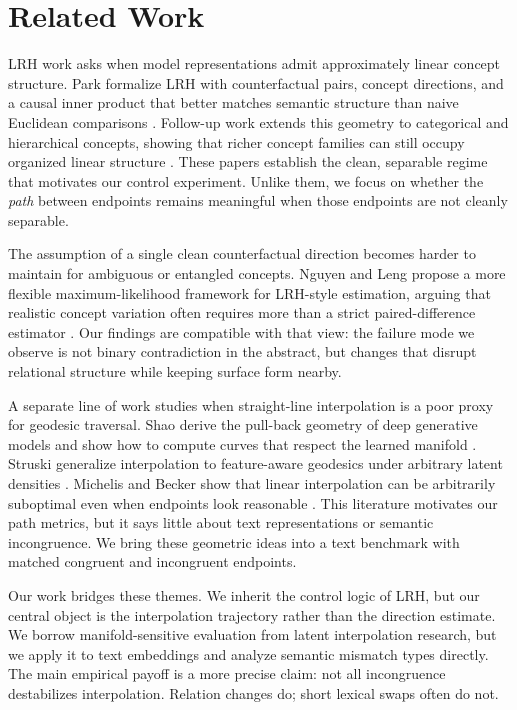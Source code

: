 \section{Related Work}
\label{sec:related}

 LRH work asks when model representations admit approximately linear concept structure. Park \etal formalize LRH with counterfactual pairs, concept directions, and a causal inner product that better matches semantic structure than naive Euclidean comparisons \cite{park2024lrh}. Follow-up work extends this geometry to categorical and hierarchical concepts, showing that richer concept families can still occupy organized linear structure \cite{park2025categorical}. These papers establish the clean, separable regime that motivates our control experiment. Unlike them, we focus on whether the {\it path} between endpoints remains meaningful when those endpoints are not cleanly separable.

 The assumption of a single clean counterfactual direction becomes harder to maintain for ambiguous or entangled concepts. Nguyen and Leng propose a more flexible maximum-likelihood framework for LRH-style estimation, arguing that realistic concept variation often requires more than a strict paired-difference estimator \cite{nguyen2025sand}. Our findings are compatible with that view: the failure mode we observe is not binary contradiction in the abstract, but changes that disrupt relational structure while keeping surface form nearby.

 A separate line of work studies when straight-line interpolation is a poor proxy for geodesic traversal. Shao \etal derive the pull-back geometry of deep generative models and show how to compute curves that respect the learned manifold \cite{shao2017riemannian}. Struski \etal generalize interpolation to feature-aware geodesics under arbitrary latent densities \cite{struski2019feature}. Michelis and Becker show that linear interpolation can be arbitrarily suboptimal even when endpoints look reasonable \cite{michelis2021linear}. This literature motivates our path metrics, but it says little about text representations or semantic incongruence. We bring these geometric ideas into a text benchmark with matched congruent and incongruent endpoints.

 Our work bridges these themes. We inherit the control logic of LRH, but our central object is the interpolation trajectory rather than the direction estimate. We borrow manifold-sensitive evaluation from latent interpolation research, but we apply it to text embeddings and analyze semantic mismatch types directly. The main empirical payoff is a more precise claim: not all incongruence destabilizes interpolation. Relation changes do; short lexical swaps often do not.
